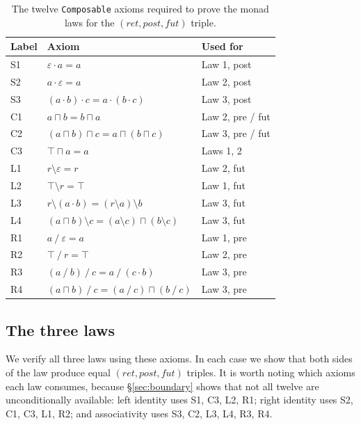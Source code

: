 \documentclass[acmsmall,screen]{acmart}
\newcommand{\post}{\mathit{post}}
\newcommand{\fut}{\mathit{fut}}
\newcommand{\ret}{\mathit{ret}}
\newcommand{\lquot}{\mathbin{\setminus}}   %
\newcommand{\rquot}{\mathbin{/}}           %
\begin{document}
\begin{table}[ht]
\caption{The twelve \lstinline{Composable} axioms required to prove the
         monad laws for the $(\ret, \post, \fut)$ triple.}
\label{tab:axioms}
\small
\begin{tabular}{lll}
\toprule
Label & Axiom & Used for \\
\midrule
S1 & $\varepsilon \cdot a = a$ & Law 1, post \\
S2 & $a \cdot \varepsilon = a$ & Law 2, post \\
S3 & $(a \cdot b) \cdot c = a \cdot (b \cdot c)$ & Law 3, post \\
\midrule
C1 & $a \sqcap b = b \sqcap a$ & Law 2, pre / fut \\
C2 & $(a \sqcap b) \sqcap c = a \sqcap (b \sqcap c)$ & Law 3, pre / fut \\
C3 & $\top \sqcap a = a$ & Laws 1, 2 \\
\midrule
L1 & $r \lquot \varepsilon = r$ & Law 2, fut \\
L2 & $\top \lquot r = \top$ & Law 1, fut \\
L3 & $r \lquot (a \cdot b) = (r \lquot a) \lquot b$ & Law 3, fut \\
L4 & $(a \sqcap b) \lquot c = (a \lquot c) \sqcap (b \lquot c)$ & Law 3, fut \\
\midrule
R1 & $a \rquot \varepsilon = a$ & Law 1, pre \\
R2 & $\top \rquot r = \top$ & Law 2, pre \\
R3 & $(a \rquot b) \rquot c = a \rquot (c \cdot b)$ & Law 3, pre \\
R4 & $(a \sqcap b) \rquot c = (a \rquot c) \sqcap (b \rquot c)$ & Law 3, pre \\
\bottomrule
\end{tabular}
\end{table}

\subsection{The three laws}
\label{sec:three-laws}

We verify all three laws using these axioms.
In each case we show that both sides of the law produce equal
$(\ret, \post, \fut)$ triples.
It is worth noting which axioms each law consumes, because
\S\ref{sec:boundary} shows that not all twelve are unconditionally
available:
left identity uses S1, C3, L2, R1;
right identity uses S2, C1, C3, L1, R2;
and associativity uses S3, C2, L3, L4, R3, R4.
\end{document}

